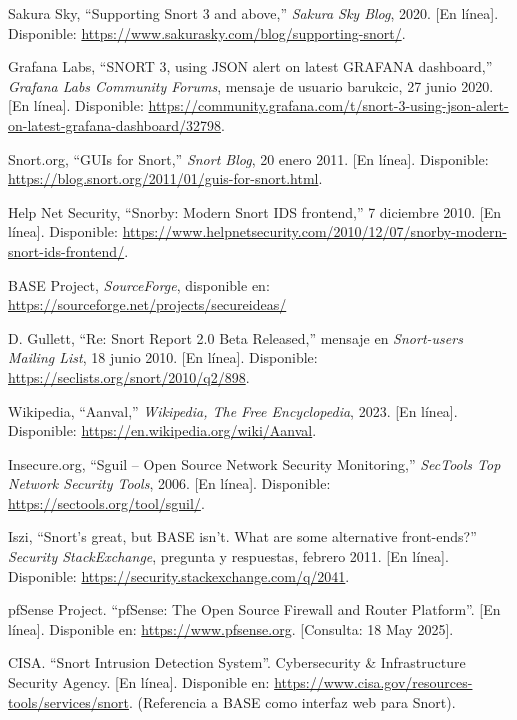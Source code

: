 \documentclass[11pt,a4paper,twoside]{report}
\begin{document}
\begin{thebibliography}{99}
	 Sakura Sky, “Supporting Snort 3 and above,” \textit{Sakura Sky Blog}, 2020. [En línea]. Disponible: \url{https://www.sakurasky.com/blog/supporting-snort/}.
	
	 Grafana Labs, “SNORT 3, using JSON alert on latest GRAFANA dashboard,” \textit{Grafana Labs Community Forums}, mensaje de usuario barukcic, 27 junio 2020. [En línea]. Disponible: \url{https://community.grafana.com/t/snort-3-using-json-alert-on-latest-grafana-dashboard/32798}.
	
	 Snort.org, “GUIs for Snort,” \textit{Snort Blog}, 20 enero 2011. [En línea]. Disponible: \url{https://blog.snort.org/2011/01/guis-for-snort.html}.
	
	 Help Net Security, “Snorby: Modern Snort IDS frontend,” 7 diciembre 2010. [En línea]. Disponible: \url{https://www.helpnetsecurity.com/2010/12/07/snorby-modern-snort-ids-frontend/}.
	
	BASE Project, \textit{SourceForge}, disponible en:
	\url{https://sourceforge.net/projects/secureideas/}
	
	 D. Gullett, “Re: Snort Report 2.0 Beta Released,” mensaje en \textit{Snort-users Mailing List}, 18 junio 2010. [En línea]. Disponible: \url{https://seclists.org/snort/2010/q2/898}.
	
	 Wikipedia, “Aanval,” \textit{Wikipedia, The Free Encyclopedia}, 2023. [En línea]. Disponible: \url{https://en.wikipedia.org/wiki/Aanval}.
	
	 Insecure.org, “Sguil – Open Source Network Security Monitoring,” \textit{SecTools Top Network Security Tools}, 2006. [En línea]. Disponible: \url{https://sectools.org/tool/sguil/}.
	
	 Iszi, “Snort’s great, but BASE isn’t. What are some alternative front-ends?” \textit{Security StackExchange}, pregunta y respuestas, febrero 2011. [En línea]. Disponible: \url{https://security.stackexchange.com/q/2041}.
	
	 pfSense Project. ``pfSense: The Open Source Firewall and Router Platform''. [En línea]. Disponible en: \url{https://www.pfsense.org}. [Consulta: 18 May 2025].
	
	 CISA. ``Snort Intrusion Detection System''. Cybersecurity \& Infrastructure Security Agency. [En línea]. Disponible en: \url{https://www.cisa.gov/resources-tools/services/snort}. (Referencia a BASE como interfaz web para Snort).
	

\end{thebibliography}
\end{document}
